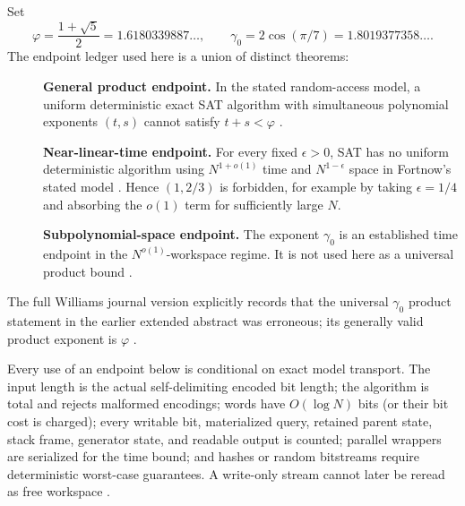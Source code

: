 \documentclass[11pt]{article}
\begin{document}
Set
\[
 \varphi=\frac{1+\sqrt5}{2}=1.6180339887\ldots,
 \qquad
 \gamma_0=2\cos(\pi/7)=1.8019377358\ldots.
\]
The endpoint ledger used here is a union of distinct theorems:
\begin{description}
\item[] \textbf{General product endpoint.}
In the stated random-access model, a uniform deterministic exact SAT
algorithm with simultaneous polynomial exponents $(t,s)$ cannot satisfy
$t+s<\varphi$ \cite{williams2010}.

\item[] \textbf{Near-linear-time endpoint.}
For every fixed $\epsilon>0$, SAT has no uniform deterministic algorithm
using $N^{1+o(1)}$ time and $N^{1-\epsilon}$ space in Fortnow's stated model
\cite{fortnow2000}.  Hence $(1,2/3)$ is forbidden, for example by taking
$\epsilon=1/4$ and absorbing the $o(1)$ term for sufficiently large $N$.

\item[] \textbf{Subpolynomial-space endpoint.}
The exponent $\gamma_0$ is an established time endpoint in the
$N^{o(1)}$-workspace regime.  It is not used here as a universal product
bound \cite{williams2008mod,busswilliams2015}.
\end{description}
The full Williams journal version explicitly records that the universal
$\gamma_0$ product statement in the earlier extended abstract was erroneous;
its generally valid product exponent is $\varphi$ \cite{williams2010}.

Every use of an endpoint below is conditional on exact model transport.  The
input length is the actual self-delimiting encoded bit length; the algorithm
is total and rejects malformed encodings; words have $O(\log N)$ bits (or
their bit cost is charged); every writable bit, materialized query, retained
parent state, stack frame, generator state, and readable output is counted;
parallel wrappers are serialized for the time bound; and hashes or random
bitstreams require deterministic worst-case guarantees.  A write-only stream
cannot later be reread as free workspace \cite[Section~2.1]{fortnowetal2005}.
\end{document}
